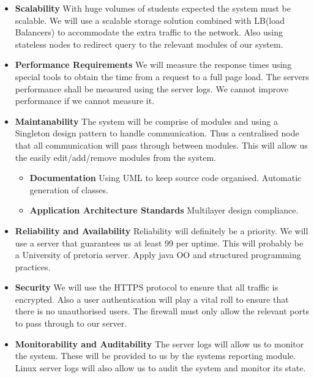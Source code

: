 
%

\begin{itemize}
	\item \textbf{Scalability}
		With huge volumes of students expected the system must be scalable. We will use a scalable storage solution combined with LB(load Balancers) to accommodate the extra traffic to the network. Also using stateless nodes to redirect query to the relevant modules of our system.
	\item \textbf{Performance Requirements}
		We will measure the response times using special tools to obtain the time from a request to a full page load. The servers performance shall be measured using the server logs. We cannot improve performance if we cannot measure it. 
	\item \textbf{Maintanability}
		The system will be comprise of modules and using a Singleton design pattern to handle communication. Thus a centralised node that all communication will pass through between modules. This will allow us the easily edit/add/remove modules from the system.
		\begin{itemize}
			\item \textbf{Documentation}
				Using UML to keep source code organised. Automatic generation of classes.
			\item \textbf{Application Architecture Standards}
				Multilayer design compliance.
		\end{itemize}
	\item \textbf{Reliability and Availability}
		Reliability will definitely be a priority. We will use a server that guarantees us at least 99 per uptime. This will probably be a University of pretoria server. Apply java OO and structured programming practices.
	\item \textbf{Security}
		We will use the HTTPS protocol to ensure that all traffic is encrypted. Also a user authentication will play a vital roll to ensure that there is no unauthorised users. The firewall must only allow the relevant ports to pass through to our server. 
	\item \textbf{Monitorability and Auditability}
		The server logs will allow us to monitor the system. These will be provided to us by the systems reporting module. Linux server logs will also allow us to audit the system and monitor its state.

\end{itemize}
